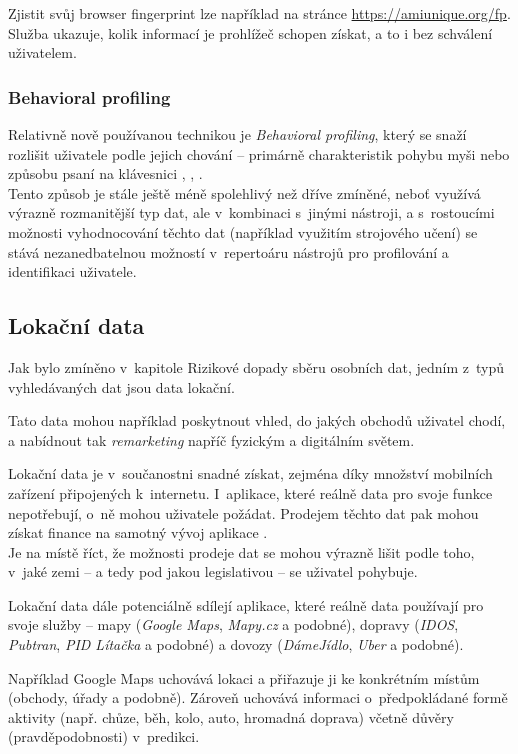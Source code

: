 Zjistit svůj browser fingerprint lze například na stránce \url{https://amiunique.org/fp}. Služba ukazuje, kolik informací je prohlížeč schopen získat, a to i bez schválení uživatelem. 

\subsubsection*{Behavioral profiling}
Relativně nově používanou technikou je \textit{Behavioral profiling}, který se snaží rozlišit uživatele podle jejich chování -- primárně charakteristik pohybu myši nebo způsobu psaní na klávesnici \citep{behavioral-profiling}, \citep{mouse-behavioral-biometrics}, \citep{digital-behavior-fingerprint}.\\
Tento způsob je stále ještě méně spolehlivý než dříve zmíněné, neboť využívá výrazně rozmanitější typ dat, ale v~kombinaci s~jinými nástroji, a s~rostoucími možnosti vyhodnocování těchto dat (například využitím strojového učení) se stává nezanedbatelnou možností v~repertoáru nástrojů pro profilování a identifikaci uživatele.

\subsection{Lokační data}
Jak bylo zmíněno v~kapitole Rizikové dopady sběru osobních dat, jedním z~typů vyhledávaných dat jsou data lokační.

Tato data mohou například poskytnout vhled, do jakých obchodů uživatel chodí, a nabídnout tak \textit{remarketing} napříč fyzickým a digitálním světem.

Lokační data je v~součanostni snadné získat, zejména díky množství mobilních zařízení připojených k~internetu. I~aplikace, které reálně data pro svoje funkce nepotřebují, o~ně mohou uživatele požádat. Prodejem těchto dat pak mohou získat finance na samotný vývoj aplikace .\\
Je na místě říct, že možnosti prodeje dat se mohou výrazně lišit podle toho, v~jaké zemi -- a tedy pod jakou legislativou -- se uživatel pohybuje.

Lokační data dále potenciálně sdílejí aplikace, které reálně data používají pro svoje služby -- mapy (\textit{Google Maps}, \textit{Mapy.cz} a podobné), dopravy (\textit{IDOS}, \textit{Pubtran}, \textit{PID Lítačka} a podobné) a dovozy (\textit{DámeJídlo}, \textit{Uber}  a podobné).

Například Google Maps uchovává lokaci a přiřazuje ji ke konkrétním místům (obchody, úřady a podobně). Zároveň uchovává informaci o~předpokládané formě aktivity (např. chůze, běh, kolo, auto, hromadná doprava) včetně důvěry (pravděpodobnosti) v~predikci.

